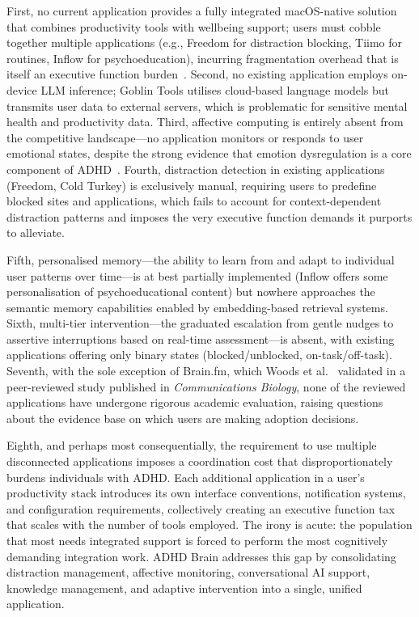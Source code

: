 First, no current application provides a fully integrated macOS-native solution that combines productivity tools with wellbeing support; users must cobble together multiple applications (e.g., Freedom for distraction blocking, Tiimo for routines, Inflow for psychoeducation), incurring fragmentation overhead that is itself an executive function burden~\cite{diamond2013}. Second, no existing application employs on-device LLM inference; Goblin Tools utilises cloud-based language models but transmits user data to external servers, which is problematic for sensitive mental health and productivity data. Third, affective computing is entirely absent from the competitive landscape---no application monitors or responds to user emotional states, despite the strong evidence that emotion dysregulation is a core component of ADHD~\cite{beattie2025}. Fourth, distraction detection in existing applications (Freedom, Cold Turkey) is exclusively manual, requiring users to predefine blocked sites and applications, which fails to account for context-dependent distraction patterns and imposes the very executive function demands it purports to alleviate.

Fifth, personalised memory---the ability to learn from and adapt to individual user patterns over time---is at best partially implemented (Inflow offers some personalisation of psychoeducational content) but nowhere approaches the semantic memory capabilities enabled by embedding-based retrieval systems. Sixth, multi-tier intervention---the graduated escalation from gentle nudges to assertive interruptions based on real-time assessment---is absent, with existing applications offering only binary states (blocked/unblocked, on-task/off-task). Seventh, with the sole exception of Brain.fm, which Woods et al.~\cite{woods2024} validated in a peer-reviewed study published in \textit{Communications Biology}, none of the reviewed applications have undergone rigorous academic evaluation, raising questions about the evidence base on which users are making adoption decisions.

Eighth, and perhaps most consequentially, the requirement to use multiple disconnected applications imposes a coordination cost that disproportionately burdens individuals with ADHD. Each additional application in a user's productivity stack introduces its own interface conventions, notification systems, and configuration requirements, collectively creating an executive function tax that scales with the number of tools employed. The irony is acute: the population that most needs integrated support is forced to perform the most cognitively demanding integration work. ADHD Brain addresses this gap by consolidating distraction management, affective monitoring, conversational AI support, knowledge management, and adaptive intervention into a single, unified application.

